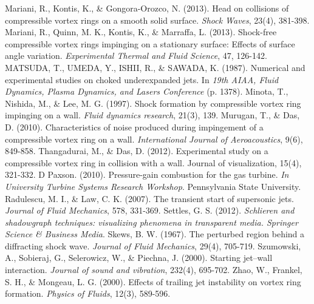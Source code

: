 \begin{thebibliography}{99}
	Mariani, R., Kontis, K., \& Gongora-Orozco, N. (2013). Head on collisions of compressible vortex rings on a smooth solid surface. \textit{Shock Waves}, 23(4), 381-398.
	Mariani, R., Quinn, M. K., Kontis, K., \& Marraffa, L. (2013). Shock-free compressible vortex rings impinging on a stationary surface: Effects of surface angle variation. \textit{Experimental Thermal and Fluid Science}, 47, 126-142.
	MATSUDA, T., UMEDA, Y., ISHII, R., \& SAWADA, K. (1987). Numerical and experimental studies on choked underexpanded jets. In \textit{19th AIAA, Fluid Dynamics, Plasma Dynamics, and Lasers Conference} (p. 1378).
	Minota, T., Nishida, M., \& Lee, M. G. (1997). Shock formation by compressible vortex ring impinging on a wall. \textit{Fluid dynamics research}, 21(3), 139.
	Murugan, T., \& Das, D. (2010). Characteristics of noise produced during impingement of a compressible vortex ring on a wall. \textit{International Journal of Aeroacoustics}, 9(6), 849-858.
	Thangadurai, M., \& Das, D. (2012). Experimental study on a compressible vortex ring in collision with a wall. Journal of visualization, 15(4), 321-332.
	D Paxson. (2010). Pressure-gain combustion for the gas turbine. \textit{In University Turbine Systems Research Workshop}. Pennsylvania State University.
	Radulescu, M. I., \& Law, C. K. (2007). The transient start of supersonic jets. \textit{Journal of Fluid Mechanics}, 578, 331-369.
	Settles, G. S. (2012). \textit{Schlieren and shadowgraph techniques: visualizing phenomena in transparent media. Springer Science \& Business Media}.
	Skews, B. W. (1967). The perturbed region behind a diffracting shock wave. \textit{Journal of Fluid Mechanics}, 29(4), 705-719.
	Szumowski, A., Sobieraj, G., Selerowicz, W., \& Piechna, J. (2000). Starting jet–wall interaction. \textit{Journal of sound and vibration}, 232(4), 695-702.
	Zhao, W., Frankel, S. H., \& Mongeau, L. G. (2000). Effects of trailing jet instability on vortex ring formation. \textit{Physics of Fluids}, 12(3), 589-596.


\end{thebibliography}

